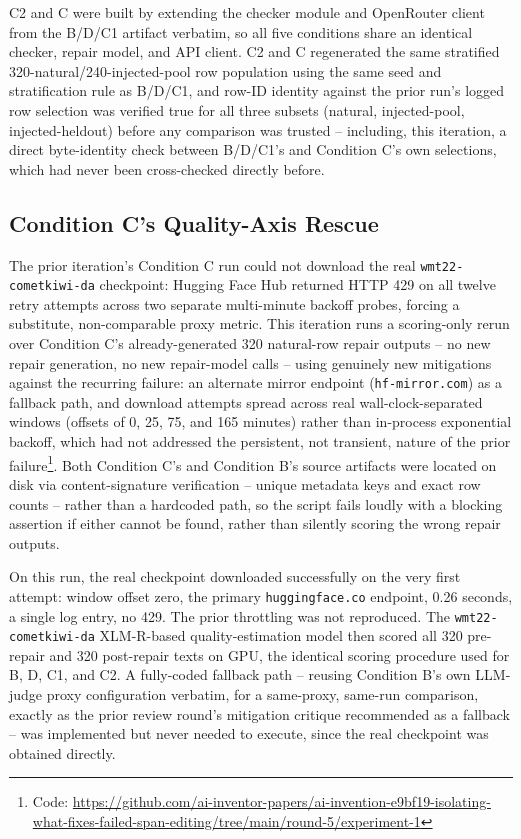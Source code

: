 \documentclass[11pt,letterpaper]{article}
\begin{document}
C2 and C were built by extending the checker module and OpenRouter client from the B/D/C1 artifact verbatim, so all five conditions share an identical checker, repair model, and API client. C2 and C regenerated the same stratified 320-natural/240-injected-pool row population using the same seed and stratification rule as B/D/C1, and row-ID identity against the prior run's logged row selection was verified true for all three subsets (natural, injected-pool, injected-heldout) before any comparison was trusted -- including, this iteration, a direct byte-identity check between B/D/C1's and Condition C's own selections, which had never been cross-checked directly before.

\subsection{Condition C's Quality-Axis Rescue}

The prior iteration's Condition C run could not download the real \texttt{wmt22-cometkiwi-da} checkpoint: Hugging Face Hub returned HTTP 429 on all twelve retry attempts across two separate multi-minute backoff probes, forcing a substitute, non-comparable proxy metric. This iteration runs a scoring-only rerun over Condition C's already-generated 320 natural-row repair outputs -- no new repair generation, no new repair-model calls -- using genuinely new mitigations against the recurring failure: an alternate mirror endpoint (\texttt{hf-mirror.com}) as a fallback path, and download attempts spread across real wall-clock-separated windows (offsets of 0, 25, 75, and 165 minutes) rather than in-process exponential backoff, which had not addressed the persistent, not transient, nature of the prior failure\footnote{Code: \url{https://github.com/ai-inventor-papers/ai-invention-e9bf19-isolating-what-fixes-failed-span-editing/tree/main/round-5/experiment-1}}. Both Condition C's and Condition B's source artifacts were located on disk via content-signature verification -- unique metadata keys and exact row counts -- rather than a hardcoded path, so the script fails loudly with a blocking assertion if either cannot be found, rather than silently scoring the wrong repair outputs.

On this run, the real checkpoint downloaded successfully on the very first attempt: window offset zero, the primary \texttt{huggingface.co} endpoint, 0.26 seconds, a single log entry, no 429. The prior throttling was not reproduced. The \texttt{wmt22-cometkiwi-da} XLM-R-based quality-estimation model then scored all 320 pre-repair and 320 post-repair texts on GPU, the identical scoring procedure used for B, D, C1, and C2. A fully-coded fallback path -- reusing Condition B's own LLM-judge proxy configuration verbatim, for a same-proxy, same-run comparison, exactly as the prior review round's mitigation critique recommended as a fallback -- was implemented but never needed to execute, since the real checkpoint was obtained directly.
\end{document}
